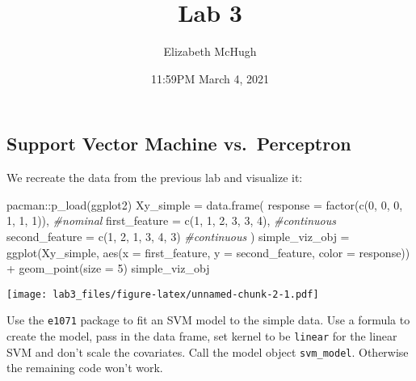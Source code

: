 \documentclass[
]{article}
\title{Lab 3}
\author{Elizabeth McHugh}
\date{11:59PM March 4, 2021}
\newenvironment{Shaded}{\begin{snugshade}}{\end{snugshade}}
\newcommand{\AttributeTok}[1]{\textcolor[rgb]{0.77,0.63,0.00}{#1}}
\newcommand{\CommentTok}[1]{\textcolor[rgb]{0.56,0.35,0.01}{\textit{#1}}}
\newcommand{\DecValTok}[1]{\textcolor[rgb]{0.00,0.00,0.81}{#1}}
\newcommand{\FunctionTok}[1]{\textcolor[rgb]{0.00,0.00,0.00}{#1}}
\newcommand{\NormalTok}[1]{#1}
\newcommand{\OtherTok}[1]{\textcolor[rgb]{0.56,0.35,0.01}{#1}}
\newcommand{\SpecialCharTok}[1]{\textcolor[rgb]{0.00,0.00,0.00}{#1}}
\begin{document}
\maketitle

\hypertarget{support-vector-machine-vs.-perceptron}{%
\subsection{Support Vector Machine
vs.~Perceptron}\label{support-vector-machine-vs.-perceptron}}

We recreate the data from the previous lab and visualize it:

\begin{Shaded}
\begin{Highlighting}[]
\NormalTok{pacman}\SpecialCharTok{::}\FunctionTok{p\_load}\NormalTok{(ggplot2)}
\NormalTok{Xy\_simple }\OtherTok{=} \FunctionTok{data.frame}\NormalTok{(}
 \AttributeTok{response =} \FunctionTok{factor}\NormalTok{(}\FunctionTok{c}\NormalTok{(}\DecValTok{0}\NormalTok{, }\DecValTok{0}\NormalTok{, }\DecValTok{0}\NormalTok{, }\DecValTok{1}\NormalTok{, }\DecValTok{1}\NormalTok{, }\DecValTok{1}\NormalTok{)), }\CommentTok{\#nominal}
 \AttributeTok{first\_feature =} \FunctionTok{c}\NormalTok{(}\DecValTok{1}\NormalTok{, }\DecValTok{1}\NormalTok{, }\DecValTok{2}\NormalTok{, }\DecValTok{3}\NormalTok{, }\DecValTok{3}\NormalTok{, }\DecValTok{4}\NormalTok{),    }\CommentTok{\#continuous}
 \AttributeTok{second\_feature =} \FunctionTok{c}\NormalTok{(}\DecValTok{1}\NormalTok{, }\DecValTok{2}\NormalTok{, }\DecValTok{1}\NormalTok{, }\DecValTok{3}\NormalTok{, }\DecValTok{4}\NormalTok{, }\DecValTok{3}\NormalTok{)    }\CommentTok{\#continuous}
\NormalTok{)}
\NormalTok{simple\_viz\_obj }\OtherTok{=} \FunctionTok{ggplot}\NormalTok{(Xy\_simple, }\FunctionTok{aes}\NormalTok{(}\AttributeTok{x =}\NormalTok{ first\_feature, }\AttributeTok{y =}\NormalTok{ second\_feature, }\AttributeTok{color =}\NormalTok{ response)) }\SpecialCharTok{+} 
  \FunctionTok{geom\_point}\NormalTok{(}\AttributeTok{size =} \DecValTok{5}\NormalTok{)}
\NormalTok{simple\_viz\_obj}
\end{Highlighting}
\end{Shaded}

\texttt{[image: lab3\_files/figure-latex/unnamed-chunk-2-1.pdf]}

Use the \texttt{e1071} package to fit an SVM model to the simple data.
Use a formula to create the model, pass in the data frame, set kernel to
be \texttt{linear} for the linear SVM and don't scale the covariates.
Call the model object \texttt{svm\_model}. Otherwise the remaining code
won't work.
\end{document}
